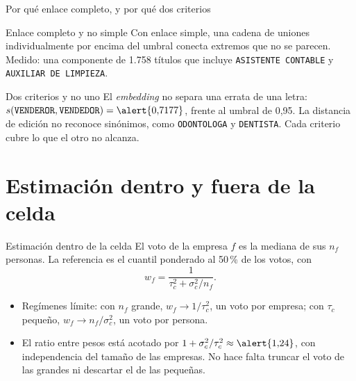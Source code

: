 \documentclass[11pt]{beamer}
\begin{document}
\begin{frame}{Por qué enlace completo, y por qué dos criterios}
\begin{block}{Enlace completo y no simple}
Con enlace simple, una cadena de uniones individualmente por encima del umbral
conecta extremos que no se parecen. Medido: una componente de \alert{1.758}
títulos que incluye \texttt{ASISTENTE CONTABLE} y \texttt{AUXILIAR DE LIMPIEZA}.
\end{block}
\begin{block}{Dos criterios y no uno}
El \textit{embedding} no separa una errata de una letra:
$s(\texttt{VENDEROR}, \texttt{VENDEDOR}) = \alert{0{,}7177}$, frente al umbral de
0,95. La distancia de edición no reconoce sinónimos, como \texttt{ODONTOLOGA} y
\texttt{DENTISTA}. Cada criterio cubre lo que el otro no alcanza.
\end{block}
\end{frame}

\section{Estimación dentro y fuera de la celda}

\begin{frame}{Estimación dentro de la celda}
El voto de la empresa $f$ es la mediana de sus $n_f$ personas. La referencia es
el cuantil ponderado al 50\,\% de los votos, con
\begin{equation*}
w_f = \frac{1}{\tau_c^2 + \sigma_c^2/n_f}.
\end{equation*}
\begin{itemize}
\item Regímenes límite: con $n_f$ grande, $w_f \to 1/\tau_c^2$, un voto por
empresa; con $\tau_c$ pequeño, $w_f \to n_f/\sigma_c^2$, un voto por persona.
\item El ratio entre pesos está acotado por
$1 + \sigma_c^2/\tau_c^2 \approx \alert{1{,}24}$, con independencia del tamaño de
las empresas. No hace falta truncar el voto de las grandes ni descartar el de las
pequeñas.
\end{itemize}
\end{frame}
\end{document}

